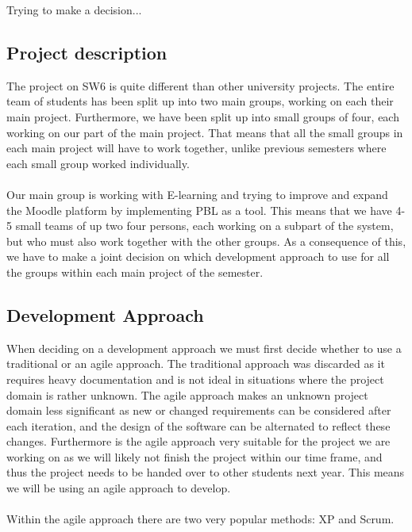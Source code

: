 Trying to make a decision... 

\subsection{Project description}
The project on SW6 is quite different than other university projects. The entire team of students has been split up into two main groups, working on each their main project. Furthermore, we have been split up into small groups of four, each working on our part of the main project. That means that all the small groups in each main project will have to work together, unlike previous semesters where each small group worked individually. 

\paragraph{}
Our main group is working with E-learning and trying to improve and expand the Moodle platform by implementing PBL as a tool. This means that we have 4-5 small teams of up two four persons, each working on a subpart of the system, but who must also work together with the other groups. As a consequence of this, we have to make a joint decision on which development approach to use for all the groups within each main project of the semester. 


\subsection{Development Approach}
When deciding on a development approach we must first decide whether to use a traditional or an agile approach.
The traditional approach was discarded as it requires heavy documentation and is not ideal in situations where the project domain is rather unknown. The agile approach makes an unknown project domain less significant as new or changed requirements can be considered after each iteration, and the design of the software can be alternated to reflect these changes. Furthermore is the agile approach very suitable for the project we are working on as we will likely not finish the project within our time frame, and thus the project needs to be handed over to other students next year. This means we will be using an agile approach to develop.

\paragraph{}
Within the agile approach there are two very popular methods: XP and Scrum.

